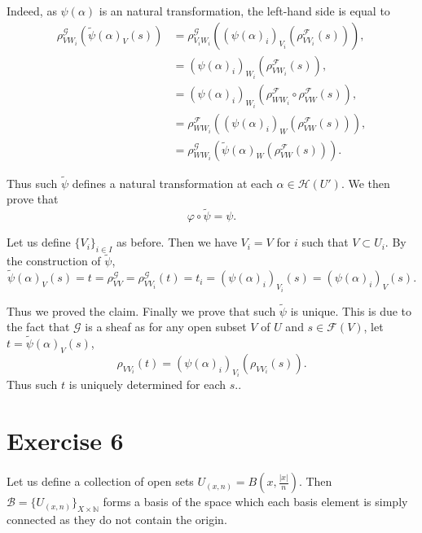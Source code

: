 \documentclass{article}
\begin{document}
Indeed, as $\psi(\alpha)$ is an natural transformation, the left-hand side is equal to
\begin{align*}
\rho_{VW_i}^{\mathcal{G}}(\tilde{\psi}(\alpha)_V(s))&=\rho_{V_iW_i}^{\mathcal{G}}((\psi(\alpha)_i)_{V_i}(\rho^{\mathcal{F}}_{VV_i}(s))),\\
&=(\psi(\alpha)_i)_{W_i}(\rho^{\mathcal{F}}_{VW_i}(s)),\\
&=(\psi(\alpha)_i)_{W_i}(\rho^{\mathcal{F}}_{WW_i}\circ\rho^{\mathcal{F}}_{VW}(s)),\\
&=\rho^{\mathcal{F}}_{WW_i}((\psi(\alpha)_i)_{W}(\rho^{\mathcal{F}}_{VW}(s))),\\
&=\rho^{\mathcal{G}}_{WW_i}(\tilde{\psi}(\alpha)_{W}(\rho^{\mathcal{F}}_{VW}(s))).
\end{align*}

Thus such $\tilde{\psi}$ defines a natural transformation at each $\alpha\in\mathcal{H}(U')$. We then prove that 
\begin{equation*}
\varphi\circ\tilde{\psi}=\psi.
\end{equation*}

Let us define $\{V_i\}_{i\in I}$ as before. Then we have $V_i = V$ for $i$ such that $V\subset U_i$. By the construction of $\tilde{\psi}$,
\begin{equation*}
\tilde{\psi}(\alpha)_V(s) = t=\rho^{\mathcal{G}}_{VV}=\rho^{\mathcal{G}}_{VV_i}(t) = t_i = (\psi(\alpha)_i)_{V_i}(s)=(\psi(\alpha)_i)_{V}(s).
\end{equation*}

Thus we proved the claim. Finally we prove that such $\tilde{\psi}$ is unique. This is due to the fact that $\mathcal{G}$ is a sheaf as for any open subset $V$ of $U$ and $s\in\mathcal{F}(V)$, let $t=\tilde{\psi}(\alpha)_V(s)$, 
\begin{equation*}
\rho_{VV_i}(t) = (\psi(\alpha)_i)_{V_i}(\rho_{VV_i}(s)).
\end{equation*}
Thus such $t$ is uniquely determined for each $s$..

\section{Exercise 6}

Let us define a collection of open sets $U_{(x,n)} = B(x,{\frac {|x|} n})$. Then $\mathcal{B}=\{U_{(x,n)}\}_{X\times\mathbb{N}}$ forms a basis of the space which each basis element is simply connected as they do not contain the origin.\\
\end{document}
